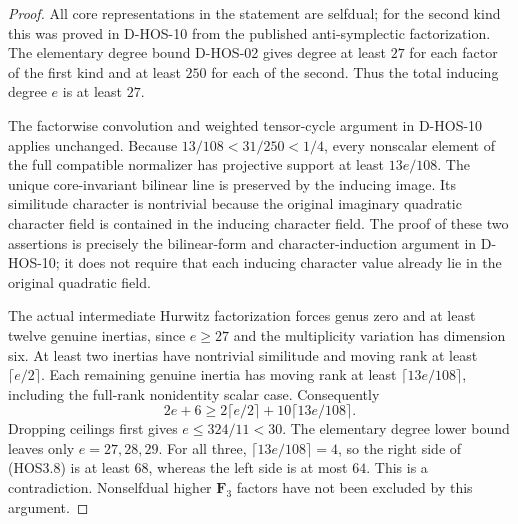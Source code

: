 \begin{proof}
All core representations in the statement are selfdual; for the
second kind this was proved in D-HOS-10 from the published
anti-symplectic factorization. The elementary degree bound
D-HOS-02 gives degree at least $27$ for each factor of the first
kind and at least $250$ for each of the second. Thus the total
inducing degree $e$ is at least $27$.

The factorwise convolution and weighted tensor-cycle argument
in D-HOS-10 applies unchanged. Because
$13/108<31/250<1/4$, every nonscalar element of the full
compatible normalizer has projective support at least $13e/108$.
The unique core-invariant bilinear line is preserved by the
inducing image. Its similitude character is nontrivial because
the original imaginary quadratic character field is contained
in the inducing character field. The proof of these two
assertions is precisely the bilinear-form and character-induction
argument in D-HOS-10; it does not require that each inducing
character value already lie in the original quadratic field.

The actual intermediate Hurwitz factorization forces genus zero
and at least twelve genuine inertias, since $e\ge27$ and the
multiplicity variation has dimension six. At least two inertias
have nontrivial similitude and moving rank at least
$\lceil e/2\rceil$. Each remaining genuine inertia has moving
rank at least $\lceil13e/108\rceil$, including the full-rank
nonidentity scalar case. Consequently
\[
 2e+6\ge2\lceil e/2\rceil
                     +10\lceil13e/108\rceil.                \tag{HOS3.8}
\]
Dropping ceilings first gives $e\le324/11<30$. The elementary
degree lower bound leaves only $e=27,28,29$. For all three,
$\lceil13e/108\rceil=4$, so the right side of (HOS3.8) is at
least $68$, whereas the left side is at most $64$. This is a
contradiction. Nonselfdual higher $\mathbf F_3$ factors have
not been excluded by this argument.
\end{proof}
